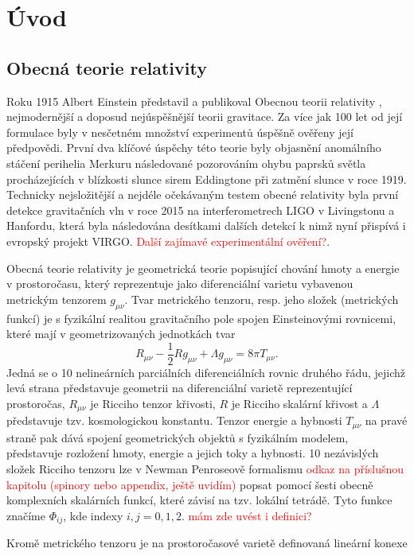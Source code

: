 \chapter*{Úvod}

\section*{Obecná teorie relativity}

Roku 1915 Albert Einstein představil a publikoval Obecnou teorii relativity \cite{Einstein1915}, nejmodernější a doposud nejúspěšnější teorii gravitace. Za více jak 100 let od její formulace byly v nesčetném množství
experimentů úspěšně ověřeny její předpovědi. První dva klíčové úspěchy této teorie byly objasnění anomálního stáčení perihelia Merkuru následované pozorováním ohybu paprsků světla procházejících v blízkosti slunce
sirem Eddingtone při zatmění slunce v roce 1919.
Technicky nejsložitější a nejdéle očekávaným testem obecné relativity byla první detekce gravitačních vln v roce 2015 na interferometrech LIGO v Livingstonu a Hanfordu, která byla následována
desítkami dalších detekcí k nimž nyní přispívá i evropský projekt VIRGO. \textcolor{red}{Další zajímavé experimentální ověření?}.



Obecná teorie relativity je geometrická teorie popisující chování hmoty a energie v prostoročasu, který reprezentuje jako diferenciální varietu vybavenou metrickým tenzorem $g_{\mu \nu}$.
Tvar metrického tenzoru, resp. jeho složek (metrických funkcí) je s fyzikální realitou gravitačního pole spojen Einsteinovými rovnicemi, které mají v geometrizovaných jednotkách
tvar
\begin{equation}
    \label{eq:einsten_field_equations}
    R_{\mu \nu} - \frac{1}{2} R g_{\mu \nu} + \Lambda g_{\mu \nu} = 8 \pi T_{\mu \nu}.
\end{equation}
Jedná se o 10 nelineárních parciálních diferenciálních rovnic druhého řádu, jejichž levá strana představuje geometrii na diferenciální varietě reprezentující prostoročas, $R_{\mu \nu}$ je Ricciho tenzor křivosti, $R$ je Ricciho skalární křivost a $\Lambda$
představuje tzv. kosmologickou konstantu. Tenzor energie a hybnosti $T_{\mu \nu}$ na pravé straně pak dává spojení geometrických objektů s fyzikálním modelem, představuje rozložení hmoty,
energie a jejich toky a hybnosti.
10 nezávislých složek Ricciho tenzoru lze v Newman Penroseově formalismu \textcolor{red}{odkaz na příslušnou kapitolu (spinory nebo appendix, ještě uvidím)} popsat pomocí šesti obecně komplexních skalárních funkcí, které
závisí na tzv. lokální tetrádě. Tyto funkce značíme $\Phi_{ij}$, kde indexy $i, j=0,1,2$. \textcolor{red}{mám zde uvést i definici?}

Kromě metrického tenzoru je na prostoročasové varietě definovaná lineární konexe